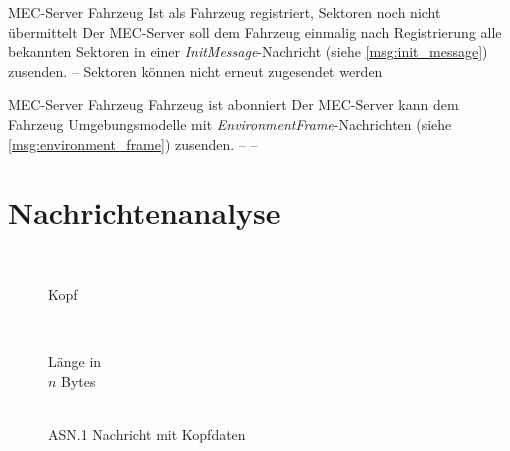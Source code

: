 	{MEC-Server}
	{Fahrzeug}
	{Ist als Fahrzeug registriert, Sektoren noch nicht übermittelt}
	{Der MEC-Server soll dem Fahrzeug einmalig nach Registrierung alle bekannten Sektoren in einer \textit{InitMessage}-Nachricht (siehe \autoref{msg:init_message}) zusenden.}
	{--}
	{Sektoren können nicht erneut zugesendet werden}
	
	{MEC-Server}
	{Fahrzeug}
	{Fahrzeug ist abonniert}
	{Der MEC-Server kann dem Fahrzeug Umgebungsmodelle mit \textit{EnvironmentFrame}-Nachrichten (siehe \autoref{msg:environment_frame}) zusenden.}
	{--}
	{--}



\newpage
\section{Nachrichtenanalyse}
\label{analysis:messages}

\begin{wrapfigure}{R}[-1.5em]{.5\textwidth}
	\centering
	\begin{bytefield}[bitwidth=.45em,bitheight=.7em]{32}
		 \\
		
		\begin{rightwordgroup}{Kopf}
			 \\
		\end{rightwordgroup} \\
		
		\begin{rightwordgroup}{Länge in\\\textbf{$n$} Bytes}
			 \\
			\skippedwords \\
		\end{rightwordgroup}
	\end{bytefield}
	\caption{ASN.1 Nachricht mit Kopfdaten}
	\label{message:structure}
\end{wrapfigure}

